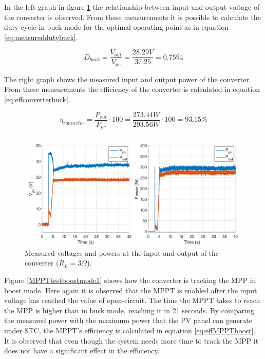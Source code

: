 In the left graph in figure \ref{MPPTtestbuckmode2} the relationship between input and output voltage of the converter is observed. From these measurements it is possible to calculate the duty cycle in buck mode for the optimal operating point as in equation \ref{eq:measureddutybuck}. 

\begin{equation} \label{eq:measureddutybuck}
D_{buck}= \dfrac{V_{out}}{V_{pv}} = \dfrac{28.29V}{37.25} = 0.7594
\end{equation}

The right graph shows the measured input and output power of the converter. From these measurements the efficiency of the converter is calculated in equation \ref{eq:effconverterbuck}.

\begin{equation} \label{eq:effconverterbuck}
\eta_{converter}= \dfrac{P_{out}}{P_{pv}} \cdot 100 = \dfrac{273.44W}{293.56W} \cdot 100 = 93.15\% 
\end{equation}


\begin{figure}[H]
	\begin{center}
		\includegraphics[width=1\textwidth]{../Pictures/P1/Test/Buck_mode_MPPT_Vin_Vout_Pin_Pout}
		\caption{Measured voltages and powers at the input and output of the converter ($R_{L}=3\Omega$).}
		\label{MPPTtestbuckmode2}
	\end{center}	
\end{figure}

Figure \ref{MPPTtestboostmode1} shows how the converter is tracking the MPP in boost mode. Here again it is observed that the MPPT is enabled after the input voltage has reached the value of open-circuit. The time the MPPT takes to reach the MPP is higher than in buck mode, reaching it in 21 seconds. By comparing the measured power with the maximum power that the PV panel can generate under STC, the MPPT's efficiency is calculated in equation \ref{eq:effMPPTboost}. It is observed that even though the system needs more time to track the MPP it does not have a significant effect in the efficiency.

